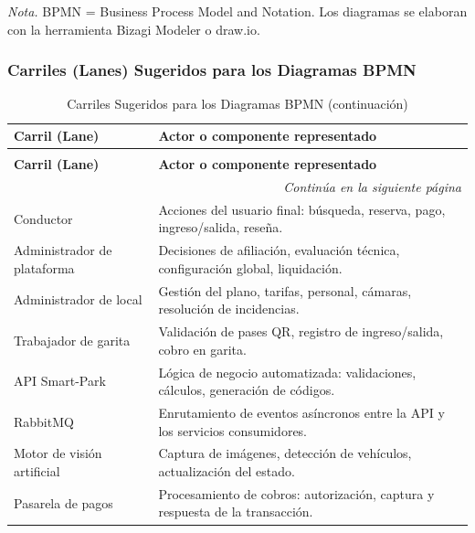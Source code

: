 \textit{Nota.} BPMN = Business Process Model and Notation. Los diagramas se elaboran con la herramienta Bizagi Modeler o draw.io.

\subsubsection{Carriles (Lanes) Sugeridos para los Diagramas BPMN}

\begin{longtable}{p{4cm} p{10cm}}
\caption{Carriles Sugeridos para los Diagramas BPMN} \\
\toprule
\textbf{Carril (Lane)} & \textbf{Actor o componente representado} \\
\midrule
\endfirsthead

\caption[]{Carriles Sugeridos para los Diagramas BPMN (continuación)} \\
\toprule
\textbf{Carril (Lane)} & \textbf{Actor o componente representado} \\
\midrule
\endhead

\midrule
\multicolumn{2}{r}{\footnotesize\textit{Continúa en la siguiente página}} \\
\endfoot

\bottomrule
\endlastfoot

Conductor & Acciones del usuario final: búsqueda, reserva, pago, ingreso/salida, reseña. \\
\midrule
Administrador de plataforma & Decisiones de afiliación, evaluación técnica, configuración global, liquidación. \\
\midrule
Administrador de local & Gestión del plano, tarifas, personal, cámaras, resolución de incidencias. \\
\midrule
Trabajador de garita & Validación de pases QR, registro de ingreso/salida, cobro en garita. \\
\midrule
API Smart-Park & Lógica de negocio automatizada: validaciones, cálculos, generación de códigos. \\
\midrule
RabbitMQ & Enrutamiento de eventos asíncronos entre la API y los servicios consumidores. \\
\midrule
Motor de visión artificial & Captura de imágenes, detección de vehículos, actualización del estado. \\
\midrule
Pasarela de pagos & Procesamiento de cobros: autorización, captura y respuesta de la transacción. \\
\end{longtable}

